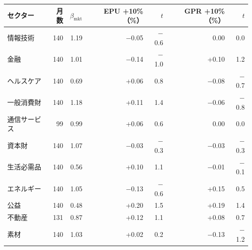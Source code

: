 \begin{tabular}{lrrrrrr}
\toprule
セクター & 月数 & $\beta_{\mathrm{mkt}}$ & EPU +10\%（\%） & $t$ & GPR +10\%（\%） & $t$ \\
\midrule
情報技術 & 140 & 1.19 & \ensuremath{-}0.05 & \ensuremath{-}0.6 & 0.00 & 0.0 \\
金融 & 140 & 1.01 & \ensuremath{-}0.14 & \ensuremath{-}1.0 & +0.10 & 1.2 \\
ヘルスケア & 140 & 0.69 & +0.06 & 0.8 & \ensuremath{-}0.08 & \ensuremath{-}0.7 \\
一般消費財 & 140 & 1.18 & +0.11 & 1.4 & \ensuremath{-}0.06 & \ensuremath{-}0.8 \\
通信サービス & 99 & 0.99 & +0.06 & 0.6 & 0.00 & 0.0 \\
資本財 & 140 & 1.07 & \ensuremath{-}0.03 & \ensuremath{-}0.3 & \ensuremath{-}0.03 & \ensuremath{-}0.3 \\
生活必需品 & 140 & 0.56 & +0.10 & 1.1 & \ensuremath{-}0.01 & \ensuremath{-}0.1 \\
エネルギー & 140 & 1.05 & \ensuremath{-}0.13 & \ensuremath{-}0.6 & +0.15 & 0.5 \\
公益 & 140 & 0.48 & +0.20 & 1.5 & +0.19 & 1.4 \\
不動産 & 131 & 0.87 & +0.12 & 1.1 & +0.08 & 0.7 \\
素材 & 140 & 1.03 & +0.02 & 0.2 & \ensuremath{-}0.13 & \ensuremath{-}1.2 \\
\bottomrule
\end{tabular}
